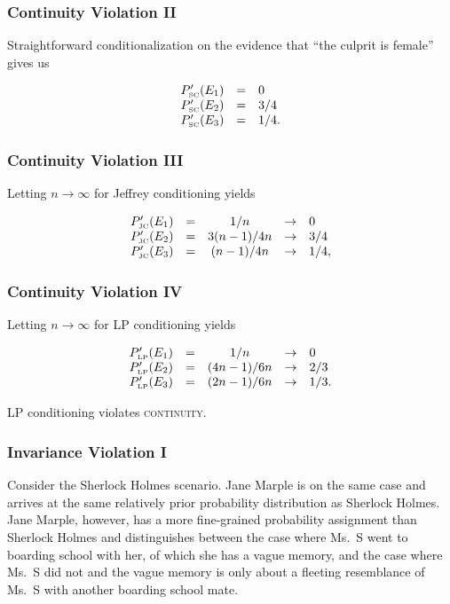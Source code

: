 \documentclass[xcolor=dvipsnames]{beamer}
\begin{document}
\begin{frame}
  \frametitle{Continuity Violation II}
Straightforward conditionalization on the evidence that ``the
  culprit is female'' gives us 

\begin{equation}
  \label{eq:sherlockcontsc}
  \begin{array}{rcl}
  P'_{\mbox{\tiny SC}}(E_{1})&=&0\\
  P'_{\mbox{\tiny SC}}(E_{2})&=&3/4\\
  P'_{\mbox{\tiny SC}}(E_{3})&=&1/4.
\end{array}
\end{equation}
\end{frame}

\begin{frame}
  \frametitle{Continuity Violation III}
Letting $n\rightarrow\infty$ for Jeffrey conditioning yields

\begin{equation}
  \label{eq:sherlockcontjc}
  \begin{array}{rcccl}
  P'_{\mbox{\tiny JC}}(E_{1})&=&1/n&\rightarrow&0\\
  P'_{\mbox{\tiny JC}}(E_{2})&=&3(n-1)/4n&\rightarrow&3/4\\
  P'_{\mbox{\tiny JC}}(E_{3})&=&(n-1)/4n&\rightarrow&1/4,
\end{array}
\end{equation}
\end{frame}

\begin{frame}
  \frametitle{Continuity Violation IV}
Letting $n\rightarrow\infty$ for LP conditioning yields

\begin{equation}
  \label{eq:sherlockcontlp}
  \begin{array}{rcccl}
  P'_{\mbox{\tiny LP}}(E_{1})&=&1/n&\rightarrow&0\\
  P'_{\mbox{\tiny LP}}(E_{2})&=&(4n-1)/6n&\rightarrow&2/3\\
  P'_{\mbox{\tiny LP}}(E_{3})&=&(2n-1)/6n&\rightarrow&1/3.
\end{array}
\end{equation}

LP conditioning violates \textsc{continuity}.
\end{frame}

\begin{frame}
  \frametitle{Invariance Violation I}
  Consider the Sherlock Holmes scenario. Jane Marple is on the same
  case and arrives at the same relatively prior probability
  distribution as Sherlock Holmes. Jane Marple, however, has a more
  fine-grained probability assignment than Sherlock Holmes and
  distinguishes between the case where Ms.\ S went to boarding school
  with her, of which she has a vague memory, and the case where Ms.\ S
  did not and the vague memory is only about a fleeting resemblance of
  Ms.\ S with another boarding school mate.
\end{frame}
\end{document}
